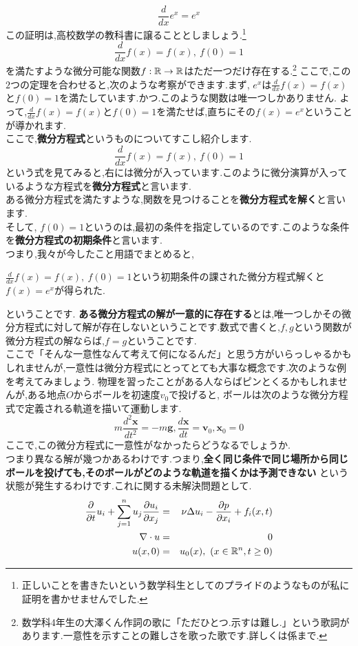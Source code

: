\thm
\[
\frac{d}{dx} e^x = e^x
\]
\thmx
この証明は,高校数学の教科書に譲ることとしましょう.\footnote{正しいことを書きたいという数学科生としてのプライドのようなものが私に証明を書かせませんでした.}
\thm
\[
\frac{d}{dx} f(x) = f(x) ,\ f(0) = 1
\]
を満たすような微分可能な関数$f:\mathbb R \to \mathbb R$はただ一つだけ存在する.\footnote{数学科4年生の大澤くん作詞の歌に「ただひとつ.示すは難し.」という歌詞があります.一意性を示すことの難しさを歌った歌です.詳しくは係まで.}
\thmx
{}
ここで,この$2$つの定理を合わせると,次のような考察ができます.まず,
$e^x$は$\frac{d}{dx}f(x) = f(x)$と$f(0)=1$を満たしています.かつ.このような関数は唯一つしかありません.
よって,$\frac{d}{dx}f(x) = f(x)$と$f(0)=1$を満たせば,直ちにその$f(x) = e^x$ということが導かれます.\\
ここで,{\bf 微分方程式}というものについてすこし紹介します.\\
\[
\frac{d}{dx} f(x) = f(x) ,\ f(0) = 1
\]
という式を見てみると,右には微分が入っています.このように微分演算が入っているような方程式を{\bf 微分方程式}と言います.\\
ある微分方程式を満たすような,関数を見つけることを{\bf 微分方程式を解く}と言います.\\
そして, $f(0) = 1$というのは,最初の条件を指定しているのです.このような条件を{\bf 微分方程式の初期条件}と言います.\\
つまり,我々が今したこと用語でまとめると,
\begin{center}
$\frac{d}{dx} f(x) = f(x) ,\ f(0) = 1$という初期条件の課された微分方程式解くと$f(x) = e^x$が得られた.
\end{center}ということです.
{\bf ある微分方程式の解が一意的に存在する}とは,唯一つしかその微分方程式に対して解が存在しないということです.数式で書くと,$f,g$という関数が微分方程式の解ならば,$f=g$ということです.\\
ここで「そんな一意性なんて考えて何になるんだ」と思う方がいらっしゃるかもしれませんが,一意性は微分方程式にとってとても大事な概念です.次のような例を考えてみましょう.
\ex
物理を習ったことがある人ならばピンとくるかもしれませんが,ある地点$O$からボールを初速度$v_0$で投げると,
ボールは次のような微分方程式で定義される軌道を描いて運動します.
\[
m \frac{d^2 \bm{x} }{dt^2}  = -m \bm{g}, \frac{d  \bm{x}}{dt} = \bm{v}_0 , \bm{x}_0 = 0 
\]
ここで,この微分方程式に一意性がなかったらどうなるでしょうか.\\
つまり異なる解が幾つかあるわけです.つまり,{\bf 全く同じ条件で同じ場所から同じボールを投げても,そのボールがどのような軌道を描くかは予測できない}
という状態が発生するわけです.これに関する未解決問題として.
\begin{eqnarray*}
\frac{\partial}{\partial t}u_i + \sum_{j=1}^n u_j \frac{\partial u_i}{\partial x_j}
&=& \nu \Delta u_i - \frac{\partial p}{\partial x_i} + f_i(x,t)\\
\nabla \cdot u &=& 0\\
u(x,0) &=& u_0(x)  , \ (x\in \mathbb R^n, t \ge 0)
\end{eqnarray*}

